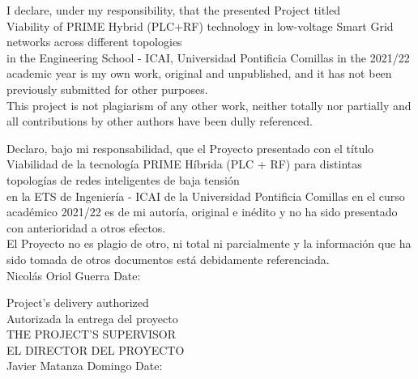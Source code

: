 \begin{mdframed}
    
 \begin{center}

\vspace*{2em}
I declare, under my responsibility, that the presented Project titled\\
\vspace*{1em}
{\large Viability of PRIME Hybrid (PLC+RF) technology in low-voltage Smart Grid networks across different topologies}\\
\vspace*{1em}
in the Engineering School - ICAI, Universidad Pontificia Comillas in the 2021/22 academic year is my own work, original and unpublished, and it has not been previously submitted for other purposes.\\
\vspace*{1em}
This project is not plagiarism of any other work, neither totally nor partially and all contributions by other authors have been dully referenced.

\vspace*{3em}
Declaro, bajo mi responsabilidad, que el Proyecto presentado con el título\\
\vspace*{1em}
{\large Viabilidad de la tecnología PRIME Híbrida (PLC + RF) para distintas topologías de redes inteligentes de baja tensión}\\
\vspace*{1em}
en la ETS de Ingeniería - ICAI de la Universidad Pontificia Comillas en el curso académico 2021/22 es de mi autoría, original e inédito y no ha sido presentado con anterioridad a otros efectos. \\
\vspace*{1em}
El Proyecto no es plagio de otro, ni total ni parcialmente y la información que ha sido tomada de otros documentos está debidamente referenciada.\\

\vspace*{3em}
Nicolás Oriol Guerra \hspace{2.6cm}  Date:

\vspace*{2em}
Project's delivery authorized\\
Autorizada la entrega del proyecto\\

\vspace*{1em}
THE PROJECT'S SUPERVISOR\\
EL DIRECTOR DEL PROYECTO\\


\vspace*{2em}
Javier Matanza Domingo \hspace{2cm}  Date:\\

\vspace*{3em}

\end{center}    
    
\end{mdframed}
